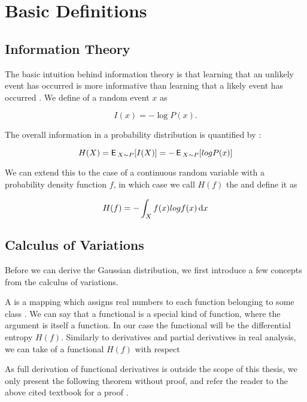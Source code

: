 \chapter{Basic Definitions}

\section{Information Theory}

The basic intuition behind information theory is that learning that an unlikely event has occurred is more informative than learning that a likely event has occurred \citep{Goodfellow-et-al-2016}. We define  of a random event $x$ as

\begin{equation}
I(x) = -\log P(x).
\end{equation}

The overall information in a probability distribution is quantified by :

\begin{equation}
H(X) = \operatorname{\textsf{E}\,}_{X \sim P} [ I(X) ] = -\operatorname{\textsf{E}\,}_{X \sim P} [ log P(x) ]
\end{equation}

We can extend this to the case of a continuous random variable with a probability density function $f$, in which case we call $H(f)$ the  and define it as

\begin{equation}
H(f) = - \int_X f(x) log f(x) \mathop{}\!\mathrm{d} x
\end{equation}

\section{Calculus of Variations}

Before we can derive the Gaussian distribution, we first introduce a few concepts from the calculus of variations.

A  is a mapping which assigns real numbers to each function belonging to some class \citep{gelfand2012calculus}. We can say that a functional is a special kind of function, where the argument is itself a function. In our case the functional will be the differential entropy $H(f)$. Similarly to derivatives and partial derivatives in real analysis, we can take  of a functional $H(f)$ with respect

As full derivation of functional derivatives is outside the scope of this thesis, we only present the following theorem without proof, and refer the reader to the above cited textbook for a proof .

